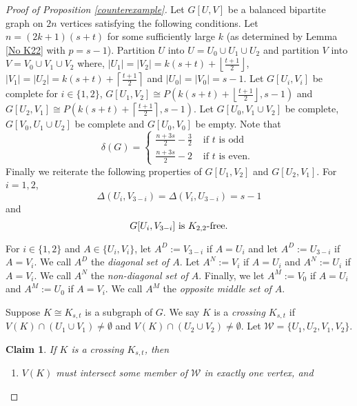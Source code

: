 \documentclass[oneside,12pt]{memoir}
\newtheorem{claim}[theorem]{Claim}
\newcommand{\floor}[1]{\left\lfloor#1\right\rfloor}
\newcommand{\ceiling}[1]{\left\lceil#1\right\rceil}
\begin{document}
\begin{proof}[Proof of Proposition \ref{counterexample}]

Let $G[U, V]$ be a balanced bipartite graph on $2n$ vertices satisfying the following conditions. Let $n=(2k+1)(s+t)$ for some sufficiently large $k$ (as determined by Lemma \ref{No K22} with $p=s-1$).  Partition $U$ into $U=U_0\cup U_1\cup U_2$ and partition $V$ into $V=V_0\cup V_1\cup V_2$ where, $|U_1|=|V_2|=k(s+t)+\floor{\frac{t+1}{2}}$, $|V_1|=|U_2|=k(s+t)+\ceiling{\frac{t+1}{2}}$ and $|U_0|=|V_0|=s-1$.  Let $G[U_i,V_i]$ be complete for $i\in\{1,2\}$, $G[U_1,V_2]\cong P\left(k(s+t)+\floor{\frac{t+1}{2}},s-1\right)$ and $G[U_2,V_1]\cong P\left(k(s+t)+\ceiling{\frac{t+1}{2}},s-1\right)$.  Let $G[U_0,V_1\cup V_2]$ be complete, $G[V_0,U_1\cup U_2]$ be complete and $G[U_0,V_0]$ be empty.  Note that 
$$\delta(G)= \left\lbrace \begin{array}{ll}\frac{n+3s}{2}-\frac{3}{2}   & \text{ if } t \text{ is odd } \\
              \frac{n+3s}{2}-2 & \text{ if } t \text{ is even. } \end{array} \right. $$
Finally we reiterate the following properties of $G[U_1, V_2]$ and $G[U_2, V_1]$.  For $i=1,2$,
\begin{equation}\label{s-1}
\Delta(U_i,V_{3-i})=\Delta(V_i, U_{3-i})=s-1
\end{equation}
and
\begin{equation}\label{K_{2,2}}
G[U_i, V_{3-i}] \text{ is } K_{2,2}\text{-free}.
\end{equation}

For $i\in\{1,2\}$ and $A\in \{U_i,V_i\}$, let $A^D:=V_{3-i}$ if $A=U_i$ and let $A^D:=U_{3-i}$ if $A=V_i$.  We call $A^D$ the \emph{diagonal set of $A$}.  Let $A^N:=V_i$ if $A=U_i$ and $A^N:=U_i$ if $A=V_i$.  We call $A^N$ the \emph{non-diagonal set of $A$}. Finally, we let $A^M:=V_0$ if $A=U_i$ and $A^M:=U_0$ if $A=V_i$.  We call $A^M$ the \emph{opposite middle set of $A$}.

Suppose $K\cong K_{s,t}$ is a subgraph of $G$. We say $K$ is a \emph{crossing $K_{s,t}$} if $V(K)\cap(U_1\cup V_1)\neq \emptyset$ and $V(K)\cap(U_2\cup V_2)\neq \emptyset$.  Let $\mathcal{W}=\{U_1, U_2, V_1, V_2\}$.  

\begin{claim}\label{claim:properties}
If $K$ is a crossing $K_{s,t}$, then 
\begin{enumerate}
\item $V(K)$ must intersect some member of $\mathcal{W}$ in exactly one vertex, and


\end{enumerate}
\end{claim}
\end{proof}
\end{document}
